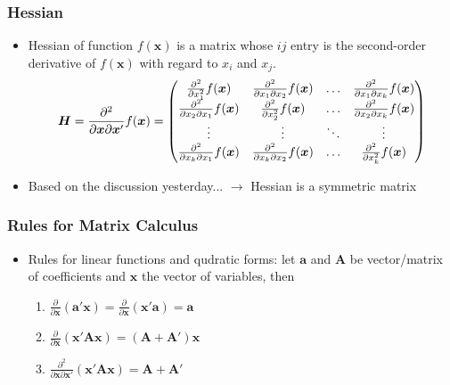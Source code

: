 \documentclass[pdflatex, 12pt]{beamer}
\begin{document}
\begin{frame}
\frametitle{Hessian}
\begin{itemize}
\item {\color{red} Hessian} of function $f(\bm{x})$ is a matrix whose $ij$ entry is the second-order derivative of $f(\bm{x})$ with regard to $x_i$ and $x_j$.
 {\small
 \begin{equation}
 \bm{H} = \frac{\partial^2}{\partial \bm{x} \partial \bm{x}'} f(\bm{x}) = \begin{pmatrix}
 \frac{\partial^2}{\partial x_1^2} f(\bm{x}) & \frac{\partial^2}{\partial x_1 \partial x_2} f(\bm{x}) & \ldots & \frac{\partial^2}{\partial x_1 \partial x_k} f(\bm{x}) \\
 \frac{\partial^2}{\partial x_2 \partial x_1} f(\bm{x}) & \frac{\partial^2}{\partial x_2^2} f(\bm{x}) & \ldots & \frac{\partial^2}{\partial x_2 \partial x_k} f(\bm{x}) \\
 \vdots & \vdots & \ddots & \vdots \\
 \frac{\partial^2}{\partial x_k \partial x_1} f(\bm{x}) & \frac{\partial^2}{\partial x_k \partial x_2} f(\bm{x}) & \ldots & \frac{\partial^2}{\partial x_k^2} f(\bm{x}) \\
 \end{pmatrix} \notag
 \end{equation}
 }
\item Based on the discussion yesterday... $\rightarrow$ Hessian is a symmetric matrix
\end{itemize}
\end{frame}

\begin{frame}
\frametitle{Rules for Matrix Calculus}
\begin{itemize}
\item Rules for linear functions and qudratic forms: let $\bm{a}$ and $\bm{A}$ be vector/matrix of coefficients and $\bm{x}$ the vector of variables, then
 \begin{enumerate}
 \item $\frac{\partial}{\partial \bm{x}} (\bm{a'x}) = \frac{\partial}{\partial \bm{x}} (\bm{x'a}) = \bm{a}$
 \item $\frac{\partial}{\partial \bm{x}} (\bm{x'Ax}) = (\bm{A} + \bm{A'})\bm{x}$
 \item $\frac{\partial^2}{\partial \bm{x}\partial \bm{x}'} (\bm{x'Ax}) = \bm{A} + \bm{A'}$
 \end{enumerate}
\end{itemize}
\end{frame}
\end{document}
